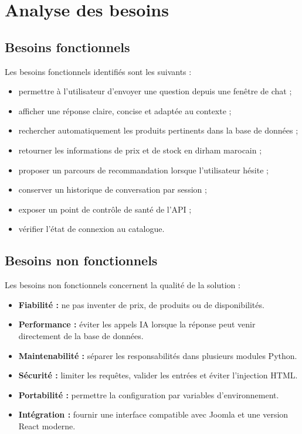 \documentclass[12pt,a4paper]{report}
\begin{document}
\chapter{Analyse des besoins}

\section{Besoins fonctionnels}

Les besoins fonctionnels identifiés sont les suivants :

\begin{itemize}
    \item permettre à l'utilisateur d'envoyer une question depuis une fenêtre de chat ;
    \item afficher une réponse claire, concise et adaptée au contexte ;
    \item rechercher automatiquement les produits pertinents dans la base de données ;
    \item retourner les informations de prix et de stock en dirham marocain ;
    \item proposer un parcours de recommandation lorsque l'utilisateur hésite ;
    \item conserver un historique de conversation par session ;
    \item exposer un point de contrôle de santé de l'API ;
    \item vérifier l'état de connexion au catalogue.
\end{itemize}

\section{Besoins non fonctionnels}

Les besoins non fonctionnels concernent la qualité de la solution :

\begin{itemize}
    \item \textbf{Fiabilité :} ne pas inventer de prix, de produits ou de disponibilités.
    \item \textbf{Performance :} éviter les appels IA lorsque la réponse peut venir directement de la base de données.
    \item \textbf{Maintenabilité :} séparer les responsabilités dans plusieurs modules Python.
    \item \textbf{Sécurité :} limiter les requêtes, valider les entrées et éviter l'injection HTML.
    \item \textbf{Portabilité :} permettre la configuration par variables d'environnement.
    \item \textbf{Intégration :} fournir une interface compatible avec Joomla et une version React moderne.
\end{itemize}
\end{document}
